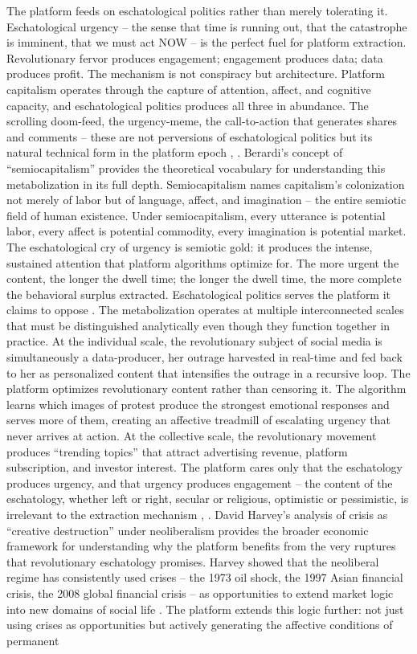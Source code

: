 The platform feeds on eschatological politics rather than merely tolerating it. Eschatological urgency – the sense that time is running out, that the catastrophe is imminent, that we must act NOW – is the perfect fuel for platform extraction. Revolutionary fervor produces engagement; engagement produces data; data produces profit. The mechanism is not conspiracy but architecture. Platform capitalism operates through the capture of attention, affect, and cognitive capacity, and eschatological politics produces all three in abundance. The scrolling doom-feed, the urgency-meme, the call-to-action that generates shares and comments – these are not perversions of eschatological politics but its natural technical form in the platform epoch \cite{zuboff_2019}, \cite{srnicek_2017}. Berardi’s concept of “semiocapitalism” provides the theoretical vocabulary for understanding this metabolization in its full depth. Semiocapitalism names capitalism’s colonization not merely of labor but of language, affect, and imagination – the entire semiotic field of human existence. Under semiocapitalism, every utterance is potential labor, every affect is potential commodity, every imagination is potential market. The eschatological cry of urgency is semiotic gold: it produces the intense, sustained attention that platform algorithms optimize for. The more urgent the content, the longer the dwell time; the longer the dwell time, the more complete the behavioral surplus extracted. Eschatological politics serves the platform it claims to oppose \cite[pp.~89-112]{berardi_2009}. The metabolization operates at multiple interconnected scales that must be distinguished analytically even though they function together in practice. At the individual scale, the revolutionary subject of social media is simultaneously a data-producer, her outrage harvested in real-time and fed back to her as personalized content that intensifies the outrage in a recursive loop. The platform optimizes revolutionary content rather than censoring it. The algorithm learns which images of protest produce the strongest emotional responses and serves more of them, creating an affective treadmill of escalating urgency that never arrives at action. At the collective scale, the revolutionary movement produces “trending topics” that attract advertising revenue, platform subscription, and investor interest. The platform cares only that the eschatology produces urgency, and that urgency produces engagement – the content of the eschatology, whether left or right, secular or religious, optimistic or pessimistic, is irrelevant to the extraction mechanism \cite[pp.~44-68]{srnicek_2017}, \cite[pp.~345-378]{zuboff_2019}. David Harvey’s analysis of crisis as “creative destruction” under neoliberalism provides the broader economic framework for understanding why the platform benefits from the very ruptures that revolutionary eschatology promises. Harvey showed that the neoliberal regime has consistently used crises – the 1973 oil shock, the 1997 Asian financial crisis, the 2008 global financial crisis – as opportunities to extend market logic into new domains of social life \cite[pp.~159-164]{harvey_2005}. The platform extends this logic further: not just using crises as opportunities but actively generating the affective conditions of permanent 